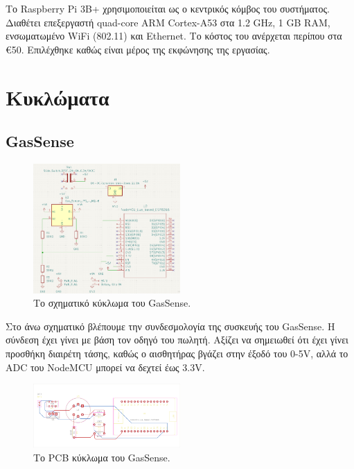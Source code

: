 \documentclass[conference]{IEEEtran}
\begin{document}
Το Raspberry Pi 3B+ χρησιμοποιείται ως ο κεντρικός κόμβος του συστήματος. Διαθέτει επεξεργαστή quad-core ARM Cortex-A53 στα 1.2 GHz, 1 GB RAM, ενσωματωμένο WiFi (802.11) και Ethernet. Το κόστος του ανέρχεται περίπου στα €50. \cite{rpi3b} Επιλέχθηκε καθώς είναι μέρος της εκφώνησης της εργασίας.

\section{Κυκλώματα}
\subsection{GasSense}

\begin{figure}[H]
	\centerline{\includegraphics[width=0.5\textwidth]{assets/gassense-schematic}}
	\caption{Το σχηματικό κύκλωμα του GasSense.}
	\label{Το σχηματικό κύκλωμα του GasSense.}
\end{figure}
Στο άνω σχηματικό βλέπουμε την συνδεσμολογία της συσκευής του GasSense. Η σύνδεση έχει γίνει με βάση τον οδηγό του πωλητή. \cite{mq6connect} Αξίζει να σημειωθεί ότι έχει γίνει προσθήκη διαιρέτη τάσης, καθώς ο αισθητήρας βγάζει στην έξοδό του 0-5V, αλλά το ADC του NodeMCU μπορεί να δεχτεί έως 3.3V. \cite{adc}

\begin{figure}[H]
	\colorbox{PineGreen}{\centerline{\includegraphics[width=0.5\textwidth]{assets/GasSense-brd}}}
	\caption{Το PCB κύκλωμα του GasSense.}
	\label{Το PCB κύκλωμα του GasSense.}
\end{figure}
\end{document}
